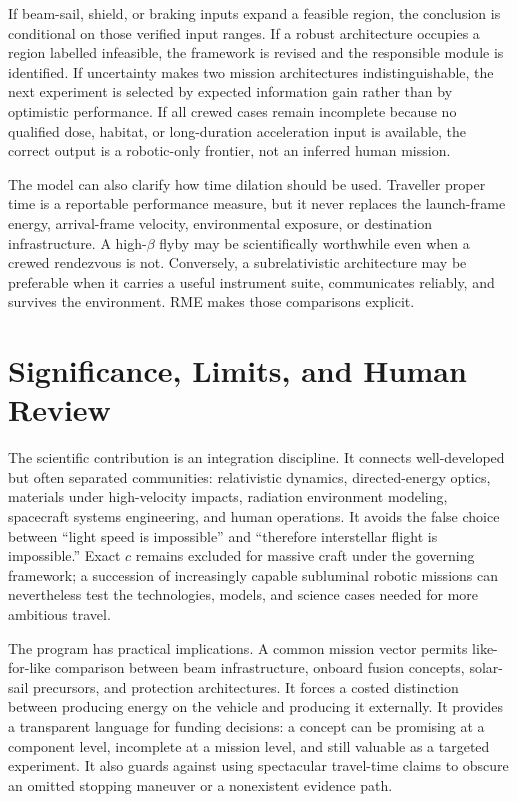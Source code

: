 \documentclass[conference]{../../../../Conference-LaTeX-template_10-17-19/IEEEtran}
\begin{document}
If beam-sail, shield, or braking inputs expand a feasible region, the conclusion is conditional on those verified input ranges. If a robust architecture occupies a region labelled infeasible, the framework is revised and the responsible module is identified. If uncertainty makes two mission architectures indistinguishable, the next experiment is selected by expected information gain rather than by optimistic performance. If all crewed cases remain incomplete because no qualified dose, habitat, or long-duration acceleration input is available, the correct output is a robotic-only frontier, not an inferred human mission.

The model can also clarify how time dilation should be used. Traveller proper time is a reportable performance measure, but it never replaces the launch-frame energy, arrival-frame velocity, environmental exposure, or destination infrastructure. A high-$\beta$ flyby may be scientifically worthwhile even when a crewed rendezvous is not. Conversely, a subrelativistic architecture may be preferable when it carries a useful instrument suite, communicates reliably, and survives the environment. RME makes those comparisons explicit.

\section{Significance, Limits, and Human Review}
The scientific contribution is an integration discipline. It connects well-developed but often separated communities: relativistic dynamics, directed-energy optics, materials under high-velocity impacts, radiation environment modeling, spacecraft systems engineering, and human operations. It avoids the false choice between ``light speed is impossible'' and ``therefore interstellar flight is impossible.'' Exact $c$ remains excluded for massive craft under the governing framework; a succession of increasingly capable subluminal robotic missions can nevertheless test the technologies, models, and science cases needed for more ambitious travel.

The program has practical implications. A common mission vector permits like-for-like comparison between beam infrastructure, onboard fusion concepts, solar-sail precursors, and protection architectures. It forces a costed distinction between producing energy on the vehicle and producing it externally. It provides a transparent language for funding decisions: a concept can be promising at a component level, incomplete at a mission level, and still valuable as a targeted experiment. It also guards against using spectacular travel-time claims to obscure an omitted stopping maneuver or a nonexistent evidence path.
\end{document}
